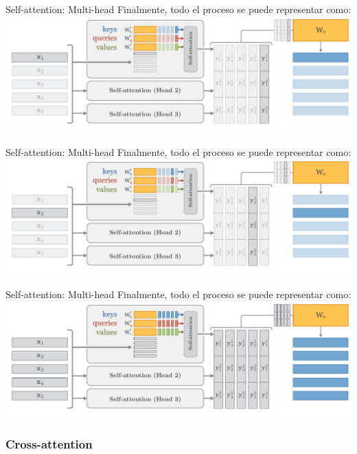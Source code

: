 \documentclass[aspectratio=169]{beamer}
\begin{document}
\begin{frame}{Self-attention: Multi-head}
  Finalmente, todo el proceso se puede representar como:\\
  \vspace{.5cm}
  \includegraphics[width=.95\textwidth, center]{imgs/tema4/att/SAT_multihead_1.pdf}
\end{frame}

\begin{frame}{Self-attention: Multi-head}
  Finalmente, todo el proceso se puede representar como:\\
  \vspace{.5cm}
  \includegraphics[width=.95\textwidth, center]{imgs/tema4/att/SAT_multihead_2.pdf}
\end{frame}

\begin{frame}{Self-attention: Multi-head}
  Finalmente, todo el proceso se puede representar como:\\
  \vspace{.5cm}
  \includegraphics[width=.95\textwidth, center]{imgs/tema4/att/SAT_multihead.pdf}
\end{frame}

\subsubsection{Cross-attention}
\end{document}

